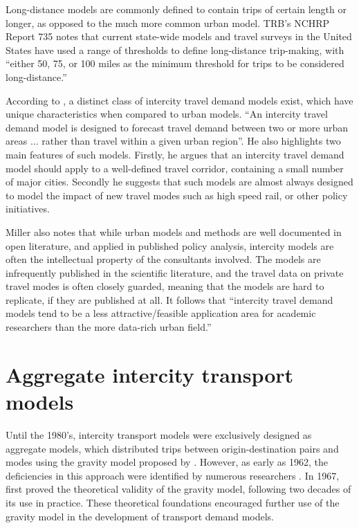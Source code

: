 Long-distance models are commonly defined to contain trips of certain length or longer, as opposed to the much more common urban model. TRB's NCHRP Report 735 notes that current state-wide models and travel surveys in the United States have used a range of thresholds to define long-distance trip-making, with \enquote{either 50, 75, or 100 miles as the minimum threshold for trips to be considered long-distance.}\autocite{schif12}

According to \textcite{miller04}, a distinct class of intercity travel demand models exist, which have unique characteristics when compared to urban models. \enquote{An intercity travel demand model is designed to forecast travel demand between two or more urban areas ... rather than travel within a given urban region}. He also highlights two main features of such models. Firstly, he argues that an intercity travel demand model should apply to a well-defined travel corridor, containing a small number of major cities. Secondly he suggests that such models are almost always designed to model the impact of new travel modes such as high speed rail, or other policy initiatives.

Miller also notes that while urban models and methods are well documented in open literature, and applied in published policy analysis, intercity models are often the intellectual property of the consultants involved. The models are infrequently published in the scientific literature, and the travel data on private travel modes is often closely guarded, meaning that the models are hard to replicate, if they are published at all. It follows that \enquote{intercity travel demand models tend to be a less attractive/feasible application area for academic researchers than the more data-rich urban field.} \parencite{miller04}

\section{Aggregate intercity transport models}

Until the 1980’s, intercity transport models were exclusively designed as aggregate models, which distributed trips between origin-destination pairs and modes using the gravity model proposed by \textcite{casey55}. However, as early as 1962, the deficiencies in this approach were identified by numerous researchers \parencite{OiSchu62, Warner62}. In 1967, \textcite{Wilson67} first proved the theoretical validity of the gravity model, following two decades of its use in practice. These theoretical foundations encouraged further use of the gravity model in the development of transport demand models. 


